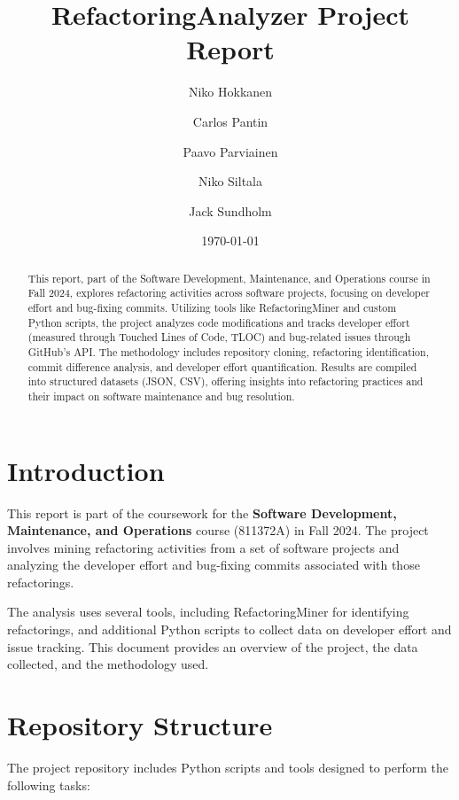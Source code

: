 \documentclass[sigconf]{acmart}
\title{RefactoringAnalyzer Project Report}
\author{Niko Hokkanen}
\affiliation{%
  \institution{University of Oulu}
  \city{Oulu}
  \country{Finland}
}
\author{Carlos Pantin}
\affiliation{%
  \institution{University of Oulu}
  \city{Oulu}
  \country{Finland}
}
\author{Paavo Parviainen}
\affiliation{%
  \institution{University of Oulu}
  \city{Oulu}
  \country{Finland}
}
\author{Niko Siltala}
\affiliation{%
  \institution{University of Oulu}
  \city{Oulu}
  \country{Finland}
}
\author{Jack Sundholm}
\affiliation{%
  \institution{University of Oulu}
  \city{Oulu}
  \country{Finland}
}
\date{\today}
\begin{document}
\begin{abstract}
This report, part of the Software Development, Maintenance, and Operations course in Fall 2024, explores refactoring activities across software projects, focusing on developer effort and bug-fixing commits. Utilizing tools like RefactoringMiner and custom Python scripts, the project analyzes code modifications and tracks developer effort (measured through Touched Lines of Code, TLOC) and bug-related issues through GitHub’s API. The methodology includes repository cloning, refactoring identification, commit difference analysis, and developer effort quantification. Results are compiled into structured datasets (JSON, CSV), offering insights into refactoring practices and their impact on software maintenance and bug resolution.
\end{abstract}


\maketitle

\section{Introduction}
This report is part of the coursework for the \textbf{Software Development, Maintenance, and Operations} course (811372A) in Fall 2024. The project involves mining refactoring activities from a set of software projects and analyzing the developer effort and bug-fixing commits associated with those refactorings.

The analysis uses several tools, including RefactoringMiner for identifying refactorings, and additional Python scripts to collect data on developer effort and issue tracking. This document provides an overview of the project, the data collected, and the methodology used.

\section{Repository Structure}
The project repository includes Python scripts and tools designed to perform the following tasks:
\end{document}
